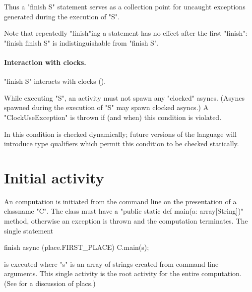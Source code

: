 Thus a \xcd"finish S" statement serves as a collection point for
uncaught exceptions generated during the execution of \xcd"S".

Note that repeatedly \xcd"finish"ing a statement has no effect after
the first \xcd"finish": \xcd"finish finish S" is indistinguishable
from \xcd"finish S".

\paragraph{Interaction with clocks.}\label{sec:finish:clock-rule}
\xcd"finish S" interacts with clocks (). 

While executing \xcd"S", an activity must not spawn any \xcd"clocked"
asyncs. (Asyncs spawned during the execution of \xcd"S" may spawn
clocked asyncs.) A
\xcd"ClockUseException" is thrown
if (and when) this condition is violated.

In \XtenCurrVer{} this condition is checked dynamically; future
versions of the language will introduce type qualifiers which permit
this condition to be checked statically.


\section{Initial activity}\label{initial-computation}

An \Xten{} computation is initiated from the command line on the
presentation of a classname \xcd"C". The class must have a
\xcd"public static def main(a: array[String])" method, otherwise an
exception is thrown
and the computation terminates.  The single statement
\begin{xten}
finish async (place.FIRST_PLACE) {
  C.main(s);
}
\end{xten} 
\noindent is executed where \xcd"s" is an array of strings created
from command line arguments. This single activity is the root activity
for the entire computation. (See  for a discussion of
placs.)

